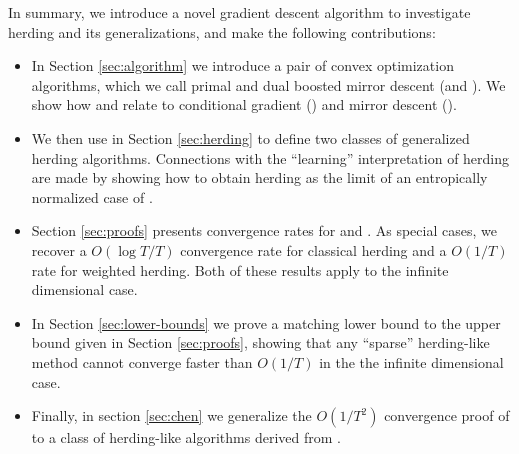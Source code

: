 \documentclass[paper.tex]{subfiles}
\begin{document}
In summary, we introduce a novel gradient descent algorithm to investigate herding and its generalizations, and make the following contributions:
\begin{itemize}
\item In Section \ref{sec:algorithm} we introduce a pair of convex optimization algorithms, which we call primal and dual boosted mirror descent (\primal and \dual). We show how \primal and \dual relate to conditional gradient (\cgd) and mirror descent (\md). 
\item We then use \dual in Section \ref{sec:herding} to define two classes of generalized herding algorithms. Connections with the ``learning'' interpretation of herding are made by showing how to obtain herding as the limit of an entropically normalized case of \dual. 
\item Section \ref{sec:proofs} presents convergence rates for \primal and \dual. As special cases, we recover a $O(\log T/ T)$ convergence rate for classical herding and a $O(1/T)$ rate for weighted herding. Both of these results apply to the infinite dimensional case. 
\item In Section \ref{sec:lower-bounds} we prove a matching lower bound to the upper bound given in Section \ref{sec:proofs}, showing that any ``sparse'' herding-like method cannot converge faster than $O(1/T)$ in the the infinite dimensional case.%
\item Finally, in section \ref{sec:chen} we generalize the $O(1/T^{2})$ convergence proof of \citet{Chen:2010a} to a class of herding-like algorithms derived from \bmd. 
\end{itemize}
\end{document}
